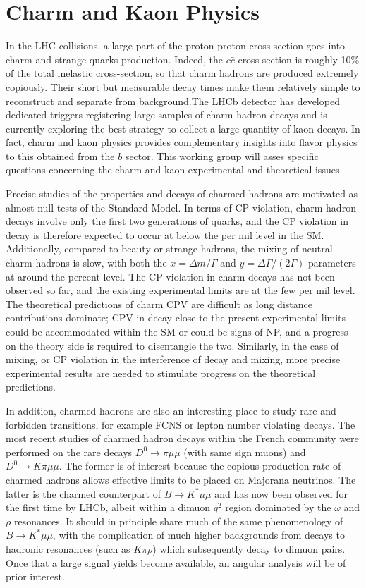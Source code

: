 \section{Charm and Kaon Physics}

In the LHC collisions, a large part of the proton-proton cross section goes into charm and strange quarks production.  Indeed, the $c \bar{c}$ cross-section is roughly 10\% of the total inelastic cross-section, so that charm hadrons are produced extremely copiously. Their short but measurable decay times make them relatively simple to reconstruct and separate from background.The LHCb detector has developed dedicated triggers registering  large samples of charm hadron decays and is currently exploring the best strategy to collect a large quantity of kaon decays. In fact, charm and kaon physics provides complementary insights into flavor physics to this obtained from the $b$ sector. This working group will asses specific questions concerning the charm and kaon experimental and theoretical issues. 

Precise studies of the properties and decays of charmed hadrons are motivated as almost-null tests of the Standard Model. In terms of CP violation, charm hadron decays involve only the first two generations of quarks, and the CP violation in decay is therefore expected to occur at below the per mil level in the SM. Additionally, compared to beauty or strange hadrons, the mixing of neutral charm hadrons is slow, with both the $x = \Delta m/\Gamma$ and $y = \Delta \Gamma/ (2\Gamma)$ parameters at around the percent level. The CP violation in charm decays has not been observed so far, and the existing experimental limits are at the few per mil level. The theoretical predictions of charm CPV are difficult as long distance contributions dominate; CPV in decay close to the present experimental limits could be accommodated within the SM or could be signs of NP, and a progress on the theory side is required to disentangle the two. Similarly, in the case of mixing, or CP violation in the interference of decay and mixing, more precise experimental results are needed to stimulate progress on the theoretical predictions.

In addition, charmed hadrons are also an interesting place to study rare and forbidden transitions, for example FCNS or lepton number violating decays. The most recent studies of charmed hadron decays within the French community were performed on the rare decays $D^0 \to \pi \mu\mu$ (with same sign muons) and $D^0 \to K \pi\mu\mu$. The former is of interest because the copious production rate of charmed hadrons allows effective limits to be placed on Majorana neutrinos. The latter is the charmed counterpart of $B\to K^*\mu\mu$ and has now been observed for the first time by LHCb, albeit within a dimuon $q^2$ region dominated by the $\omega$ and $\rho$ resonances. It should in principle share much of the same phenomenology of $B\to K^*\mu\mu$,  with the complication of much higher backgrounds from decays to hadronic resonances (such as $K\pi\rho$) which subsequently decay to dimuon pairs. Once that a large signal yields become available, an angular analysis will be of prior interest. 


